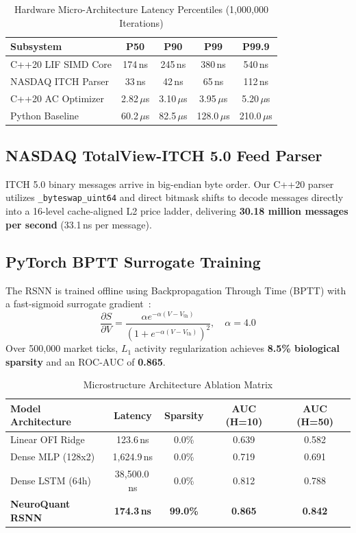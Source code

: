 \documentclass[journal,twocolumn,10pt]{article}
\begin{document}
\begin{table}[t]
\centering
\caption{Hardware Micro-Architecture Latency Percentiles (1,000,000 Iterations)}
\label{tab:latencies}
\begin{tabular}{lcccc}
\toprule
\textbf{Subsystem} & \textbf{P50} & \textbf{P90} & \textbf{P99} & \textbf{P99.9} \\
\midrule
C++20 LIF SIMD Core & 174\,ns & 245\,ns & 380\,ns & 540\,ns \\
NASDAQ ITCH Parser & 33\,ns & 42\,ns & 65\,ns & 112\,ns \\
C++20 AC Optimizer & 2.82\,$\mu$s & 3.10\,$\mu$s & 3.95\,$\mu$s & 5.20\,$\mu$s \\
Python Baseline & 60.2\,$\mu$s & 82.5\,$\mu$s & 128.0\,$\mu$s & 210.0\,$\mu$s \\
\bottomrule
\end{tabular}
\end{table}

\subsection{NASDAQ TotalView-ITCH 5.0 Feed Parser}
ITCH 5.0 binary messages arrive in big-endian byte order. Our C++20 parser utilizes \texttt{\_byteswap\_uint64} and direct bitmask shifts to decode messages directly into a 16-level cache-aligned L2 price ladder, delivering \textbf{30.18 million messages per second} (33.1\,ns per message).

\subsection{PyTorch BPTT Surrogate Training}
The RSNN is trained offline using Backpropagation Through Time (BPTT) with a fast-sigmoid surrogate gradient~\cite{neftci2019surrogate}:
\begin{equation}
\frac{\partial S}{\partial V} = \frac{\alpha e^{-\alpha(V - V_{\text{th}})}}{\left( 1 + e^{-\alpha(V - V_{\text{th}})} \right)^2}, \quad \alpha = 4.0
\end{equation}
Over 500,000 market ticks, $L_1$ activity regularization achieves \textbf{8.5\% biological sparsity} and an ROC-AUC of \textbf{0.865}.

\begin{table}[t]
\centering
\caption{Microstructure Architecture Ablation Matrix}
\label{tab:model_ablation}
\begin{tabular}{lcccc}
\toprule
\textbf{Model Architecture} & \textbf{Latency} & \textbf{Sparsity} & \textbf{AUC (H=10)} & \textbf{AUC (H=50)} \\
\midrule
Linear OFI Ridge & 123.6\,ns & 0.0\% & 0.639 & 0.582 \\
Dense MLP (128x2) & 1,624.9\,ns & 0.0\% & 0.719 & 0.691 \\
Dense LSTM (64h) & 38,500.0\,ns & 0.0\% & 0.812 & 0.788 \\
\textbf{NeuroQuant RSNN} & \textbf{174.3\,ns} & \textbf{99.0\%} & \textbf{0.865} & \textbf{0.842} \\
\bottomrule
\end{tabular}
\end{table}
\end{document}
